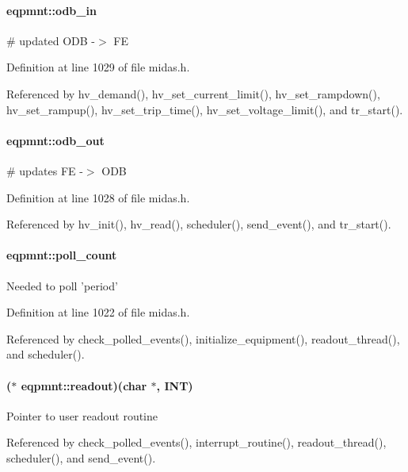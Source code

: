 \paragraph[{odb\_\-in}]{ {\bf eqpmnt::odb\_\-in}}\hfill\label{structeqpmnt_ab487ff66b0ceb7677a3e664717158c51}
\# updated ODB -\/$>$ FE 

Definition at line 1029 of file midas.h.

Referenced by hv\_\-demand(), hv\_\-set\_\-current\_\-limit(), hv\_\-set\_\-rampdown(), hv\_\-set\_\-rampup(), hv\_\-set\_\-trip\_\-time(), hv\_\-set\_\-voltage\_\-limit(), and tr\_\-start().
\paragraph[{odb\_\-out}]{ {\bf eqpmnt::odb\_\-out}}\hfill\label{structeqpmnt_a2ba622da82fc7a02605e5f630464b13f}
\# updates FE -\/$>$ ODB 

Definition at line 1028 of file midas.h.

Referenced by hv\_\-init(), hv\_\-read(), scheduler(), send\_\-event(), and tr\_\-start().
\paragraph[{poll\_\-count}]{ {\bf eqpmnt::poll\_\-count}}\hfill\label{structeqpmnt_ae9bf94db8ff48533601c3833b1b20097}
Needed to poll 'period' 

Definition at line 1022 of file midas.h.

Referenced by check\_\-polled\_\-events(), initialize\_\-equipment(), readout\_\-thread(), and scheduler().
\paragraph[{readout}]{($\ast$ {\bf eqpmnt::readout})(char $\ast$, {\bf INT})}\hfill\label{structeqpmnt_ab7d302c46bbcfe6151e17bac90451ee3}
Pointer to user readout routine 

Referenced by check\_\-polled\_\-events(), interrupt\_\-routine(), readout\_\-thread(), scheduler(), and send\_\-event().
